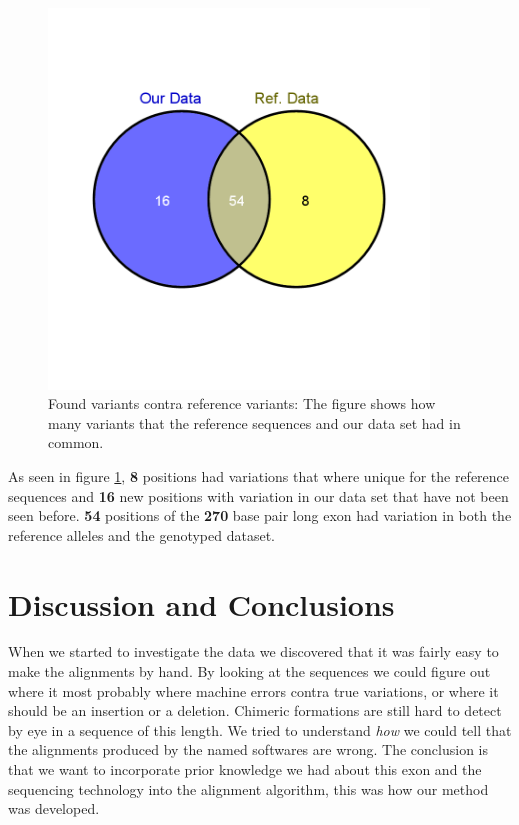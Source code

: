 \documentclass[a4paper,11pt]{kth-mag}
\begin{document}
\begin{figure}[ht]
	\centering
		\includegraphics[width=0.9\textwidth]{../pictures/variants.png}
	\caption{Found variants contra reference variants: The figure shows how many variants that the reference sequences and our data set had in common.}
	\label{fig:variants}
\end{figure}

As seen in figure \ref{fig:variants}, \textbf{8} positions had variations that where unique for the reference sequences and \textbf{16} new positions with variation in our data set that have not been seen before. \textbf{54} positions of the \textbf{270} base pair long exon had variation in both the reference alleles and the genotyped dataset.


\section{Discussion and Conclusions}

When we started to investigate the data we discovered that it was fairly easy to make the alignments by hand. By looking at the sequences we could figure out where it most probably where machine errors contra true variations, or where it should be an insertion or a deletion. Chimeric formations are still hard to detect by eye in a sequence of this length. We tried to understand \emph{how} we could tell that the alignments produced by the named softwares are wrong. The conclusion is that we want to incorporate prior knowledge we had about this exon and the sequencing technology into the alignment algorithm, this was how our method was developed.
\end{document}

